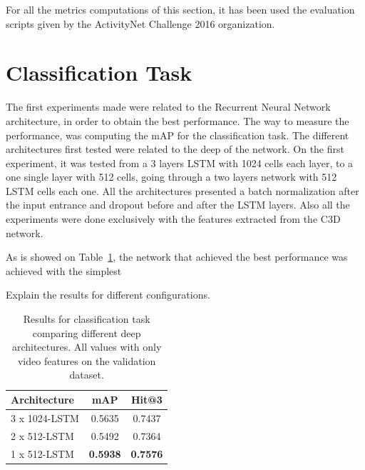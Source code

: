 For all the metrics computations of this section, it has been used the evaluation scripts given by the ActivityNet Challenge 2016 organization.

\section{Classification Task}

The first experiments made were related to the Recurrent Neural Network architecture, in order to obtain the best performance. The way to measure the performance, was computing the mAP for the classification task. The different architectures first tested were related to the deep of the network. On the first experiment, it was tested from a 3 layers LSTM with 1024 cells each layer, to a one single layer with 512 cells, going through a two layers network with 512 LSTM cells each one. All the architectures presented a batch normalization after the input entrance and dropout before and after the LSTM layers. Also all the experiments were done exclusively with the features extracted from the C3D network.

As is showed on Table~\ref{table:classification_by_architecture}, the network that achieved the best performance was achieved with the simplest 

Explain the results for different configurations.

\begin{table}[H]
\begin{center}
\begin{tabular}{|l|c|c|}
\hline
Architecture & mAP & Hit@3 \\
\hline\hline
3 x 1024-LSTM & 0.5635 & 0.7437 \\
2 x 512-LSTM & 0.5492 & 0.7364 \\
1 x 512-LSTM & \bf0.5938 & \bf0.7576 \\
\hline
\end{tabular}
\end{center}
\caption{Results for classification task comparing different deep architectures. All values with
         only video features on the validation dataset.}
\label{table:classification_by_architecture}
\end{table}



